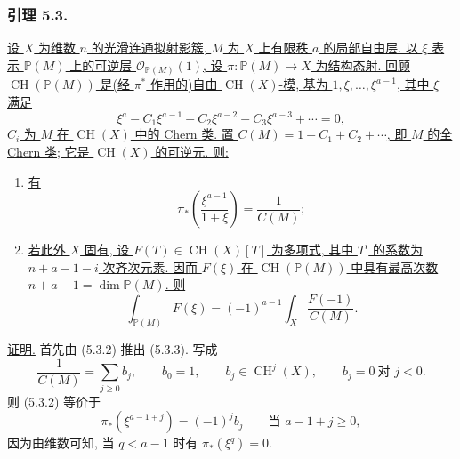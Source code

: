 \subsubsection*{引理 5.3.}
\underline{设 $X$ 为维数 $n$ 的光滑连通拟射影簇, $M$ 为 $X$ 上有限秩 $a$ 的局部自由层. 以 $\xi$ 表示 $\mathbb P(M)$ 上的可逆层 $\mathcal O_{\mathbb P(M)}(1)$, 设 $\pi:\mathbb P(M)\to X$ 为结构态射. 回顾 $\operatorname{CH}(\mathbb P(M))$ 是(经 $\pi^*$ 作用的)自由 $\operatorname{CH}(X)$-模, 基为 $1,\xi,\ldots,\xi^{a-1}$, 其中 $\xi$ 满足}
\begin{equation}\tag{5.3.1}
\xi^a-C_1\xi^{a-1}+C_2\xi^{a-2}-C_3\xi^{a-3}+\cdots=0,
\end{equation}
\underline{$C_i$ 为 $M$ 在 $\operatorname{CH}(X)$ 中的 Chern 类. 置 $C(M)=1+C_1+C_2+\cdots$, 即 $M$ 的全 Chern 类; 它是 $\operatorname{CH}(X)$ 的可逆元. 则:}

\begin{enumerate}
\item[(i)] \underline{有}
\begin{equation}\tag{5.3.2}
\pi_*\!\left(\frac{\xi^{a-1}}{1+\xi}\right)
=\frac{1}{C(M)};
\end{equation}
\item[(ii)] \underline{若此外 $X$ 固有, 设 $F(T)\in\operatorname{CH}(X)[T]$ 为多项式, 其中 $T^i$ 的系数为 $n+a-1-i$ 次齐次元素. 因而 $F(\xi)$ 在 $\operatorname{CH}(\mathbb P(M))$ 中具有最高次数 $n+a-1=\dim\mathbb P(M)$. 则}
\begin{equation}\tag{5.3.3}
\int_{\mathbb P(M)}F(\xi)
=(-1)^{a-1}\int_X\frac{F(-1)}{C(M)}.
\end{equation}
\end{enumerate}

\noindent\underline{证明.}
首先由 (5.3.2) 推出 (5.3.3). 写成
\begin{equation}\tag{5.3.4}
\frac{1}{C(M)}=\sum_{j\geq0}b_j,\qquad
b_0=1,\qquad
b_j\in\operatorname{CH}^j(X),\qquad
b_j=0\ \text{对 }j<0.
\end{equation}
则 (5.3.2) 等价于
\begin{equation}\tag{5.3.5}
\pi_*(\xi^{a-1+j})=(-1)^jb_j
\qquad\text{当 }a-1+j\geq0,
\end{equation}
因为由维数可知, 当 $q<a-1$ 时有 $\pi_*(\xi^q)=0$.

